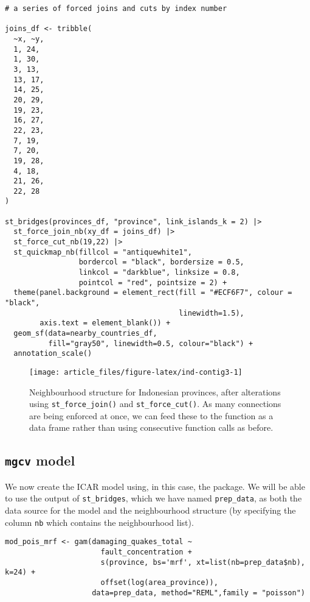\begin{verbatim}
# a series of forced joins and cuts by index number

joins_df <- tribble(
  ~x, ~y,
  1, 24,
  1, 30,
  3, 13,
  13, 17,
  14, 25,
  20, 29,
  19, 23,
  16, 27,
  22, 23,
  7, 19,
  7, 20,
  19, 28,
  4, 18,
  21, 26,
  22, 28
)

st_bridges(provinces_df, "province", link_islands_k = 2) |> 
  st_force_join_nb(xy_df = joins_df) |> 
  st_force_cut_nb(19,22) |> 
  st_quickmap_nb(fillcol = "antiquewhite1", 
                 bordercol = "black", bordersize = 0.5, 
                 linkcol = "darkblue", linksize = 0.8, 
                 pointcol = "red", pointsize = 2) + 
  theme(panel.background = element_rect(fill = "#ECF6F7", colour = "black", 
                                        linewidth=1.5),
        axis.text = element_blank()) +
  geom_sf(data=nearby_countries_df, 
          fill="gray50", linewidth=0.5, colour="black") + 
  annotation_scale()
\end{verbatim}

\begin{figure}

{\centering \texttt{[image: article\_files/figure-latex/ind-contig3-1]} 

}

\caption{Neighbourhood structure for Indonesian provinces, after alterations using \texttt{st\_force\_join()} and \texttt{st\_force\_cut()}. As many connections are being enforced at once, we can feed these to the function as a data frame rather than using consecutive function calls as before.}\label{fig:ind-contig3}
\end{figure}

\subsection{\texorpdfstring{\texttt{mgcv} model}{mgcv model}}\label{mgcv-model}

We now create the ICAR model using, in this case, the  package. We will be able to use the output of \texttt{st\_bridges}, which we have named \texttt{prep\_data}, as both the data source for the model and the neighbourhood structure (by specifying the column \texttt{nb} which contains the neighbourhood list).

\begin{verbatim}
mod_pois_mrf <- gam(damaging_quakes_total ~ 
                      fault_concentration +
                      s(province, bs='mrf', xt=list(nb=prep_data$nb), k=24) +
                      offset(log(area_province)),
                    data=prep_data, method="REML",family = "poisson")
\end{verbatim}

